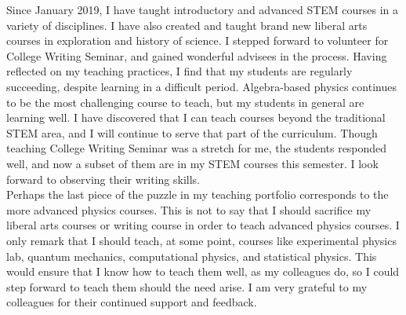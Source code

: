 \documentclass[../../main.tex]{subfiles}
\begin{document}
Since January 2019, I have taught introductory and advanced STEM courses in a variety of disciplines.  I have also created and taught brand new liberal arts courses in exploration and history of science.  I stepped forward to volunteer for College Writing Seminar, and gained wonderful advisees in the process.  Having reflected on my teaching practices, I find that my students are regularly succeeding, despite learning in a difficult period.  Algebra-based physics continues to be the most challenging course to teach, but my students in general are learning well.  I have discovered that I can teach courses beyond the traditional STEM area, and I will continue to serve that part of the curriculum.  Though teaching College Writing Seminar was a stretch for me, the students responded well, and now a subset of them are in my STEM courses this semester.  I look forward to observing their writing skills.
\\
\vspace{0.25cm}
Perhaps the last piece of the puzzle in my teaching portfolio corresponds to the more advanced physics courses.  This is not to say that I should sacrifice my liberal arts courses or writing course in order to teach advanced physics courses.  I only remark that I should teach, at some point, courses like experimental physics lab, quantum mechanics, computational physics, and statistical physics.  This would ensure that I know how to teach them well, as my colleagues do, so I could step forward to teach them should the need arise.  I am very grateful to my colleagues for their continued support and feedback.
\end{document}
